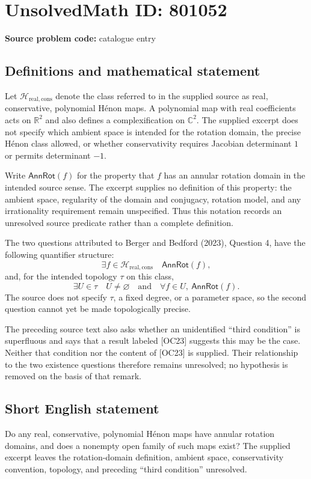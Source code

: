 \documentclass[11pt]{article}
\newcommand{\R}{\mathbb{R}}
\newcommand{\C}{\mathbb{C}}
\begin{document}
\section*{UnsolvedMath ID: 801052}
\textbf{Source problem code:} catalogue entry
\subsection{Definitions and mathematical statement}
Let \(\mathcal H_{\mathrm{real,cons}}\) denote the class referred to in the supplied source as real, conservative, polynomial H\'enon maps. A polynomial map with real coefficients acts on \(\R^2\) and also defines a complexification on \(\C^2\). The supplied excerpt does not specify which ambient space is intended for the rotation domain, the precise H\'enon class allowed, or whether conservativity requires Jacobian determinant \(1\) or permits determinant \(-1\).

Write \(\mathsf{AnnRot}(f)\) for the property that \(f\) has an annular rotation domain in the intended source sense. The excerpt supplies no definition of this property: the ambient space, regularity of the domain and conjugacy, rotation model, and any irrationality requirement remain unspecified. Thus this notation records an unresolved source predicate rather than a complete definition.

The two questions attributed to Berger and Bedford (2023), Question 4, have the following quantifier structure:
\[
\exists f\in\mathcal H_{\mathrm{real,cons}}\quad \mathsf{AnnRot}(f),
\]
and, for the intended topology \(\tau\) on this class,
\[
\exists U\in\tau\quad
U\ne\varnothing
\quad\text{and}\quad
\forall f\in U,\ \mathsf{AnnRot}(f).
\]
The source does not specify \(\tau\), a fixed degree, or a parameter space, so the second question cannot yet be made topologically precise.

The preceding source text also asks whether an unidentified ``third condition'' is superfluous and says that a result labeled [OC23] suggests this may be the case. Neither that condition nor the content of [OC23] is supplied. Their relationship to the two existence questions therefore remains unresolved; no hypothesis is removed on the basis of that remark.
\subsection{Short English statement}
Do any real, conservative, polynomial H\'enon maps have annular rotation domains, and does a nonempty open family of such maps exist? The supplied excerpt leaves the rotation-domain definition, ambient space, conservativity convention, topology, and preceding ``third condition'' unresolved.
\end{document}
